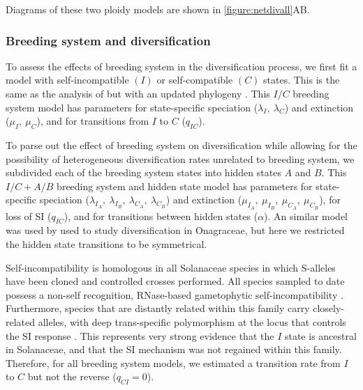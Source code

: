 Diagrams of these two ploidy models are shown in \cref{figure:netdivall}AB.  %

\subsubsection{Breeding system and diversification}

To assess the effects of breeding system in the diversification process, we first fit a model with self-incompatible $(I)$ or self-compatible $(C)$ states.
This is the same as the analysis of \citet{goldberg_2010} but with an updated phylogeny \citep{sarkinen_2013}.
This $I/C$ breeding system model has parameters for state-specific speciation ($\lambda_I,\ \lambda_C$) and extinction ($\mu_I,\ \mu_C$), and for transitions from $I$ to $C$ ($q_{IC}$).

To parse out the effect of breeding system on diversification while allowing for the possibility of heterogeneous diversification rates unrelated to breeding system, we subdivided each of the breeding system states into hidden states $A$ and $B$.
This $I/C+A/B$ breeding system and hidden state model has parameters for state-specific speciation ($\lambda_{I_A},\ \lambda_{I_B},\ \lambda_{C_A},\ \lambda_{C_B}$) and extinction ($\mu_{I_A},\ \mu_{I_B},\ \mu_{C_A},\ \mu_{C_B}$), for loss of SI ($q_{IC}$), and for transitions between hidden states ($\alpha$).
An similar model was used by \citet{freyman_2017} used to study diversification in Onagraceae, but here we restricted the hidden state transitions to be symmetrical. %

Self-incompatibility is homologous in all Solanaceae species in which S-alleles have been cloned and controlled crosses performed.
All species sampled to date possess a non-self recognition, RNase-based gametophytic self-incompatibility \citep[shared even with other euasterid families;][]{ramanauskas_2017}.
Furthermore, species that are distantly related within this family carry closely-related alleles, with deep trans-specific polymorphism at the locus that controls the SI response \citep{ioerger_1990, igic_2006}.
This represents very strong evidence that the $I$ state is ancestral in Solanaceae, and that the SI mechanism was not regained within this family.
Therefore, for all breeding system models, we estimated a transition rate from $I$ to $C$  but not the reverse ($q_{CI}=0$).
%

